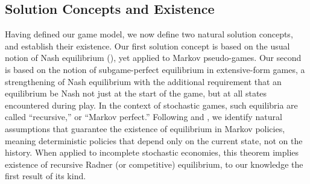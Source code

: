 


\subsection{Solution Concepts and Existence}
\label{sec:gmg_exist}

Having defined our game model, we now define two natural solution concepts, and establish their existence.
Our first solution concept is based on the usual notion of Nash equilibrium (\citeyear{nash1950existence}), yet applied to Markov pseudo-games.
Our second is based on the notion of subgame-perfect equilibrium in extensive-form games, a strengthening of Nash equilibrium with the additional requirement that an equilibrium be Nash not just at the start of the game, but at all states encountered during play.
In the context of stochastic games, such equilibria are called ``recursive,'' or ``Markov perfect.''
Following \citet{bellman1966dynamic} and \citet{arrow-debreu}, we identify natural assumptions that guarantee the existence of equilibrium in  Markov
policies, meaning deterministic policies that depend only on the current state, not on the history.
When applied to incomplete stochastic economies, this theorem implies existence of recursive Radner (or competitive) equilibrium, to our knowledge the first result of its kind.


